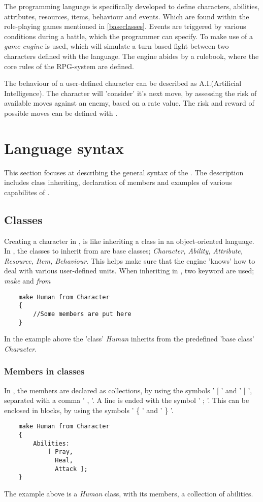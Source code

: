 The programming language \langname{} is specifically developed to define characters, abilities, attributes, resources, items, behaviour and events. Which are found within the role-playing games mentioned in \vref{baseclasses}. Events are triggered by various conditions during a battle, which the programmer can specify.
To make use of \langname{} a \emph{game engine} is used, which will simulate a turn based fight between two characters defined with the language. The engine abides by a rulebook, where the core rules of the RPG-system are defined. 

The behaviour of a user-defined character can be described as A.I.(Artificial Intelligence). The character will 'consider' it's next move, by assessing the risk of available moves against an enemy, based on a rate value. The risk and reward of possible moves can be defined with \langname{}.

\section{Language syntax}
This section focuses at describing the general syntax of the \langname{}. The description includes class inheriting, declaration of members and examples of various capabilites of \langname{}.

\subsection{Classes}
Creating a character in \langname{}, is like inheriting a class in an object-oriented language.
In \langname{}, the classes to inherit from are base classes; \emph{Character, Ability, Attribute, Resource, Item, Behaviour}. This helps make sure that the engine 'knows' how to deal with various user-defined units.
When inheriting in \langname{}, two keyword are used; \emph{make} and \emph{from}
\begin{lstlisting}
	make Human from Character
	{
		//Some members are put here
	}
\end{lstlisting}
In the example above the 'class' \emph{Human} inherits from the predefined 'base class' \emph{Character}.

\subsubsection*{Members in classes}
In \langname{}, the members are declared as collections, by using the symbols ' [ ' and ' ] ', separated with a comma ' , '.
A line is ended with the symbol ' ; '.
This can be enclosed in blocks, by using the symbols ' \{ ' and ' \} '.
\begin{lstlisting}
	make Human from Character
	{	
		Abilities:
			[ Pray, 
			  Heal,
			  Attack ];
	}
\end{lstlisting}
The example above is a \emph{Human} class, with its members, a collection of abilities.

